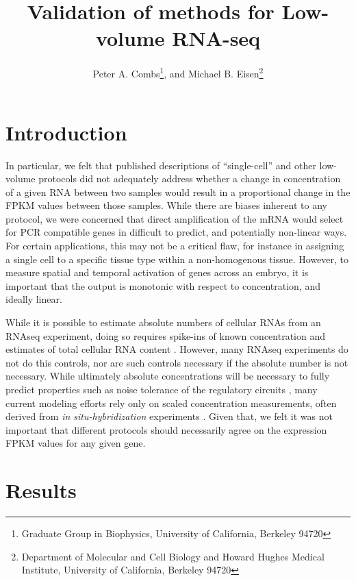 \documentclass[12pt]{article}
\begin{document}
\title{Validation of methods for Low-volume RNA-seq}
\author{Peter A. Combs\footnote{Graduate Group in Biophysics, University of California, Berkeley 94720}, and Michael B. Eisen\footnote{Department of Molecular and Cell Biology and Howard Hughes Medical Institute, University of California, Berkeley 94720}}
\maketitle
\linenumbers

\abstract{
}

\section{Introduction}

In particular, we felt that published descriptions of ``single-cell'' and other low-volume protocols did not adequately address whether a change in concentration of a given RNA between two samples would result in a proportional change in the FPKM values between those samples. While there are biases inherent to any protocol, we were concerned that direct amplification of the mRNA would select for PCR compatible genes in difficult to predict, and potentially non-linear ways.  For certain applications, this may not be a critical flaw, for instance in assigning a single cell to a specific tissue type within a non-homogenous tissue.  However, to measure spatial and temporal activation of genes across an embryo, it is important that the output is monotonic with respect to concentration, and ideally linear.

While it is possible to estimate absolute numbers of cellular RNAs from an RNAseq experiment, doing so requires spike-ins of known concentration and estimates of total cellular RNA content \cite{Mortazavi:2008jj}. However, many RNAseq experiments do not do this controls, nor are such controls necessary if the absolute number is not necessary. While ultimately absolute concentrations will be necessary to fully predict properties such as noise tolerance of the regulatory circuits \cite{Gregor:2007du,Gregor:2005jn}, many current modeling efforts rely only on scaled concentration measurements, often derived from {\em in situ-hybridization} experiments \cite{Garcia:2013fs,Ilsley:2013fk,He:2010ix}.  Given that, we felt it was not important that different protocols should necessarily agree on the expression FPKM values for any given gene.

\section{Results}
\end{document}
